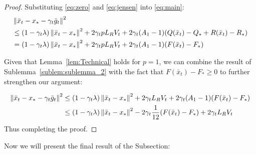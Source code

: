 \begin{proof}
    Substituting \eqref{eq:zero} and \eqref{eq:jensen} into \eqref{eq:main}:
    \begin{align}
        &\left\|\bar{x}_t - x_* - \gamma_{t} \bar{g}_t\right\|^2 \\
        &\leq (1 - \gamma_{t} \lambda)\left\|\bar{x}_t - x_*\right\|^2 + 2 \gamma_{t} p L_R V_t
        + 2\gamma_{t} (A_1 - 1)(Q(\bar{x}_t) - Q_* + R(\bar{x}_t) - R_*) \\
        &= (1 - \gamma_{t} \lambda)\left\|\bar{x}_t - x_*\right\|^2 + 2 \gamma_{t} p L_R V_t
        + 2\gamma_{t} (A_1 - 1)(F(\bar{x}_t) - F_*)
    \end{align}
    
    Given that Lemma~\ref{lem:Technical} holds for $p = 1$, we can combine the result of Sublemma~\ref{sublem:sublemma_2} with the fact that $F(\bar{x}_t) - F_* \geq 0$ to further strengthen our argument:
    
    \begin{align}
        \left\|\bar{x}_t - x_* - \gamma_{t} \bar{g}_t\right\|^2 &
        \leq (1 - \gamma_{t} \lambda)\left\|\bar{x}_t - x_*\right\|^2 + 2 \gamma_{t} L_R V_t
        + 2\gamma_{t} (A_1 - 1)(F(\bar{x}_t) - F_*) \\
        &\leq (1 - \gamma_{t} \lambda)\left\|\bar{x}_t - x_*\right\|^2 - 2\gamma_{t} \frac{1}{12}(F(\bar{x}_t) - F_*) + 2 \gamma_{t} L_R V_t
    \end{align}
    Thus completing the proof.
\end{proof}


Now we will present the final result of the Subsection:


